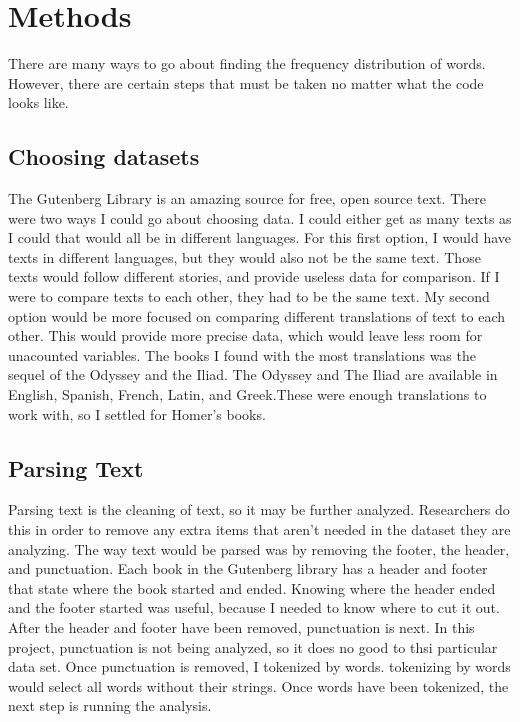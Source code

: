 \documentclass[a4paper,10pt]{article}
\newcounter{code}[section]
\begin{document}
\section{Methods}

There are many ways to go about finding the frequency distribution of words. However, there are certain steps that must be taken no matter what the code looks like.  

\subsection{Choosing datasets}

The Gutenberg Library is an amazing source for free, open source text. There were two ways I could go about choosing data. I could either get as many texts as I could that would all be in different languages. For this first option, I would have texts in different languages, but they would also not be the same text. Those texts would follow different stories, and provide useless data for comparison. If I were to compare texts to each other, they had to be the same text. My second option would be more focused on comparing different translations of text to each other. This would provide more precise data, which would leave less room for unacounted variables. The books I found with the most translations was the sequel of the Odyssey and the Iliad. The Odyssey and The Iliad are available in English, Spanish, French, Latin, and Greek.These were enough translations to work with, so I settled for Homer's books. 


\subsection{Parsing Text}

Parsing text is the cleaning of text, so it may be further analyzed. Researchers do this in order to remove any extra items that aren’t needed in the dataset they are analyzing. The way text would be parsed was by removing the footer, the header, and punctuation. Each book in the Gutenberg library  has a header and footer that state where the book started and ended. Knowing where the header ended and the footer started was useful, because I needed to know where to cut it out. After the header and footer have been removed, punctuation is next. In this project, punctuation is not being analyzed, so it does no good to thsi particular data set. Once punctuation is removed, I tokenized by words. tokenizing by words would select all words without their strings. Once words have been tokenized, the next step is running the analysis.
\end{document}

